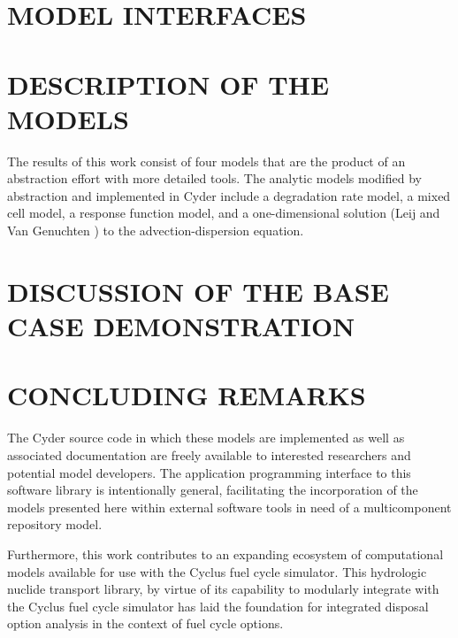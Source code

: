\documentclass[letterpaper, 11pt]{article}
\begin{document}
\section*{MODEL INTERFACES}



\section*{DESCRIPTION OF THE MODELS}

The results of this work consist of four models that are the product of an 
abstraction effort with more detailed tools.  The analytic models modified by 
abstraction and implemented in Cyder include a degradation rate model, a mixed 
cell model, a response function model, and a one-dimensional solution (Leij and 
Van Genuchten \cite{leij_analytical_1991}) to the advection-dispersion equation.










\section*{DISCUSSION OF THE BASE CASE DEMONSTRATION}


\section*{CONCLUDING REMARKS}
The Cyder source code in which these models are implemented as well as 
associated documentation are freely available to interested researchers and 
potential model developers. The application programming interface to this 
software library is intentionally general, facilitating the incorporation of the 
models presented here within external software tools in need of a multicomponent 
repository model.

Furthermore, this work contributes to an expanding ecosystem of computational 
models available for use with the Cyclus fuel cycle simulator. This hydrologic 
nuclide transport library, by virtue of its capability to modularly integrate 
with the Cyclus fuel cycle simulator has laid the foundation for integrated 
disposal option analysis in the context of fuel cycle options. 




\end{document}

